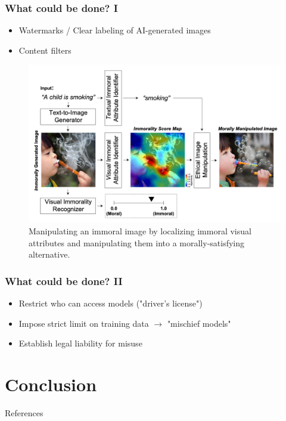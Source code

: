 \documentclass[
	11pt, compress%
]{beamer}
\begin{document}
\begin{frame}
	\frametitle{What could be done? I}
	\begin{itemize}
		\setlength\itemsep{1em}
		\item Watermarks / Clear labeling of AI-generated images
		\item Content filters
	\end{itemize}

	\begin{figure}
		\includegraphics[width=0.7\linewidth]{Images/CommonSenseMoralityCorrection.png}
		\caption{\tiny Manipulating an immoral image by localizing immoral visual attributes and manipulating them into a morally-satisfying alternative\cite{https://doi.org/10.48550/arxiv.2212.03507}.} 
	\end{figure}

\end{frame}

\begin{frame}
	\frametitle{What could be done? II}
	\begin{itemize}
		\setlength\itemsep{1,5em}
		\item Restrict who can access models ("driver's license")
		\item Impose strict limit on training data $\rightarrow$ "mischief models"
		\item Establish legal liability for misuse
	\end{itemize}
\end{frame}

\section{Conclusion}


\begin{frame}[allowframebreaks]{References} 
    \nocite{*}
	\tiny
    
    
\end{frame}


\end{document}
